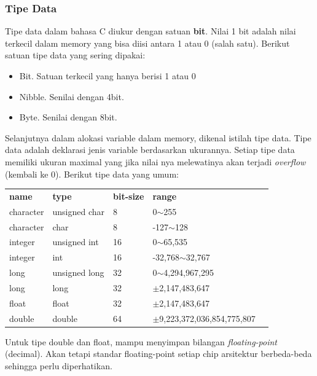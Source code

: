 \documentclass[12pt,]{article}
\begin{document}
	\subsubsection{Tipe Data}
	Tipe data dalam bahasa C diukur dengan satuan \textbf{bit}.
	Nilai 1 bit adalah nilai terkecil dalam memory yang bisa diisi antara 1 atau 0 (salah satu).
	Berikut satuan tipe data yang sering dipakai:
	\begin{itemize}
		\item Bit. Satuan terkecil yang hanya berisi 1 atau 0
		\item Nibble. Senilai dengan 4bit.
		\item Byte. Senilai dengan 8bit.
	\end{itemize}
	
	Selanjutnya dalam alokasi variable dalam memory, dikenal istilah tipe data.
	Tipe data adalah deklarasi jenis variable berdasarkan ukurannya.
	Setiap tipe data memiliki ukuran maximal yang jika nilai nya melewatinya akan terjadi \textit{overflow} (kembali ke 0).
	Berikut tipe data yang umum:
	\begin{table}[H]
		\begin{tabular}{|l|l|l|l|l}
			\cline{1-4}
			\textbf{name}      & \textbf{type}          & \textbf{bit-size} & \textbf{range} &  \\ \cline{1-4}
			character & unsigned char & 8  & 0$\sim$255           &  \\ \cline{1-4}
			character & char          & 8  & -127$\sim$128        &  \\ \cline{1-4}
			integer   & unsigned int  & 16 & 0$\sim$65,535        &  \\ \cline{1-4}
			integer   & int  		  & 16 & -32,768$\sim$32,767  &  \\ \cline{1-4}
			long	  & unsigned long & 32 & 0$\sim$4,294,967,295 &  \\ \cline{1-4}
			long	  & long 		  & 32 & $\pm$2,147,483,647	  &  \\ \cline{1-4}
			float	  & float 		  & 32 & $\pm$2,147,483,647	  &  \\ \cline{1-4}
			double	  & double 		  & 64 & $\pm$9,223,372,036,854,775,807	&  \\ \cline{1-4}
		\end{tabular}
	\end{table}
	Untuk tipe double dan float, mampu menyimpan bilangan \textit{floating-point} (decimal).
	Akan tetapi standar floating-point setiap chip arsitektur berbeda-beda sehingga perlu diperhatikan.
	
\end{document}
